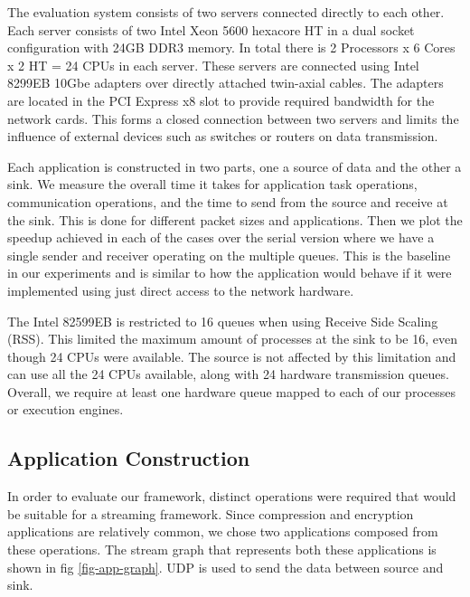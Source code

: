 \documentclass[10pt, conference, compsocconf, reqno]{IEEEtran}
\newcommand{\comment}[1]{}
\begin{document}
The evaluation system consists of two servers connected directly to each other. Each server consists of two Intel Xeon 5600 hexacore HT in a dual socket configuration with 24GB DDR3 memory. In total there is 2 Processors x 6 Cores x 2 HT = 24 CPUs in each server. These servers are connected using Intel 8299EB 10Gbe adapters over directly attached twin-axial cables. The adapters are located in the PCI Express x8 slot to provide required bandwidth for the network cards. This forms a closed connection between two servers and limits the influence of external devices such as switches or routers on data transmission.

Each application is constructed in two parts, one a source of data and the other a sink. We measure the overall time it takes for application task operations, communication operations, and the time to send from the source and receive at the sink. This is done for different packet sizes and applications. Then we plot the speedup achieved in each of the cases over the serial version where we have a single sender and receiver operating on the multiple queues. This is the baseline in our experiments and is similar to how the application would behave if it were implemented using just direct access to the network hardware.

The Intel 82599EB is restricted to 16 queues when using Receive Side Scaling (RSS). This limited the maximum amount of processes at the sink to be 16, even though 24 CPUs were available. The source is not affected by this limitation and can use all the 24 CPUs available, along with 24 hardware transmission queues. Overall, we require at least one hardware queue mapped to each of our processes or execution engines. \comment{We also ensure that each of the processes are bound to a particular CPU by issuing affinity calls to the OS to ensure that they are not migrated between different cores.}

\subsection{Application Construction}
\label{app-const}

In order to evaluate our framework, distinct operations were required that would be suitable for a streaming framework. Since compression and encryption applications are relatively common, we chose two applications composed from these operations. The stream graph that represents both these applications is shown in fig \ref{fig-app-graph}. UDP is used to send the data between source and sink.
\end{document}
